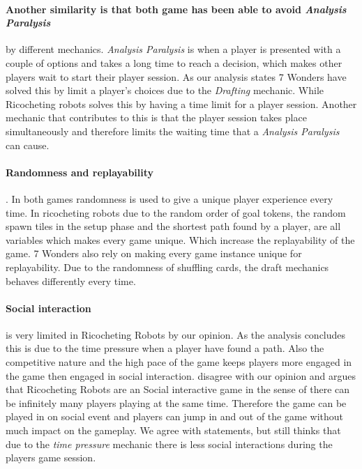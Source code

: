 \documentclass[a4paper]{article}
\begin{document}
  \paragraph{Another similarity is that both game has been able to avoid \textit{Analysis Paralysis}} by different mechanics.
  \textit{Analysis Paralysis} is when a player is presented with a couple of options and takes a long time to reach a decision, which makes other players wait to start their player session.
  As our analysis states 7 Wonders have solved this by limit a player's choices due to the \textit{Drafting} mechanic.
  While Ricocheting robots solves this by having a time limit for a player session.
  Another mechanic that contributes to this is that the player session takes place simultaneously and therefore limits the waiting time that a \textit{Analysis Paralysis} can cause.

  \paragraph{Randomness and replayability}.
  In both games randomness is used to give a unique player experience every time.
  In ricocheting robots due to the random order of goal tokens, the random spawn tiles in the setup phase and the shortest path found by a player, are all variables which makes every game unique. Which increase the replayability of the game. 7 Wonders also rely on making every game instance unique for replayability. Due to the randomness of shuffling cards, the draft mechanics behaves differently every time.

  \paragraph{Social interaction} is very limited in Ricocheting Robots by our opinion.
  As the analysis concludes this is due to the time pressure when a player have found a path.
  Also the competitive nature and the high pace of the game keeps players more engaged in the game then engaged in social interaction.
   disagree with our opinion and argues that Ricocheting Robots are an Social interactive game in the sense of there can be infinitely many players playing at the same time.
  Therefore the game can be played in on social event and players can jump in and out of the game without much impact on the gameplay.
  We agree with \citeauthor{danbeckRR} statements, but still thinks that due to the \textit{time pressure} mechanic there is less social interactions during the players game session.
\end{document}
